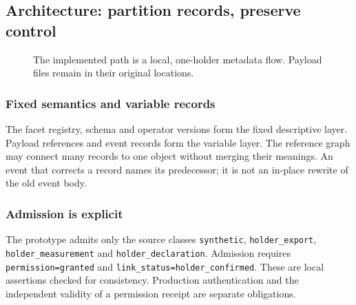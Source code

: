 \documentclass[11pt,a4paper]{article}
\newcommand{\newpagehead}[1]{\clearpage\subsection{#1}}
\begin{document}
\newpagehead{Architecture: partition records, preserve control}
\begin{figure}[H]\centering
{}
\caption{The implemented path is a local, one-holder metadata flow. Payload files remain in their original locations.}
\end{figure}

\subsubsection{Fixed semantics and variable records}
The facet registry, schema and operator versions form the fixed descriptive layer. Payload references and event records form the variable layer. The reference graph may connect many records to one object without merging their meanings. An event that corrects a record names its predecessor; it is not an in-place rewrite of the old event body.

\subsubsection{Admission is explicit}
The prototype admits only the source classes \texttt{synthetic}, \texttt{holder\_export}, \texttt{holder\_measurement} and \texttt{holder\_declaration}. Admission requires \texttt{permission=granted} and \texttt{link\_status=holder\_confirmed}. These are local assertions checked for consistency. Production authentication and the independent validity of a permission receipt are separate obligations.
\end{document}

